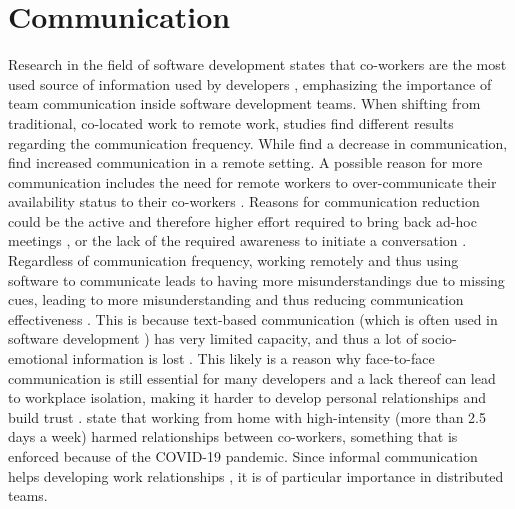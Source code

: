 \section{Communication}
Research in the field of software development states that co-workers are the most used source of information used by developers \autocite{ko2007information}, emphasizing the importance of team communication inside software development teams. When shifting from traditional, co-located work to remote work, studies find different results regarding the communication frequency. While \textcite{kraut1988patterns, allen1984managing} find a decrease in communication, \textcite{mulki2009set} find increased communication in a remote setting. A possible reason for more communication includes the need for remote workers to over-communicate their availability status to their co-workers \autocite{koehne2012remote}. Reasons for communication reduction could be the active and therefore higher effort required to bring back ad-hoc meetings \autocite{miller2021your}, or the lack of the required awareness to initiate a conversation \autocite{chang2007out, gutwin1995support}. Regardless of communication frequency, working remotely and thus using software to communicate leads to having more misunderstandings due to missing cues, leading to more misunderstanding and thus reducing communication effectiveness \autocite{mulki2009set}. This is because text-based communication (which is often used in software development \autocite{gutwin2004group}) has very limited capacity, and thus a lot of socio-emotional information is lost \autocite{hassib2017heartchat}. This likely is a reason why face-to-face communication is still essential for many developers \autocite{storey2016social} and a lack thereof can lead to workplace isolation, making it harder to develop personal relationships and build trust \autocite{mulki2009set}. \textcite{gajendran2007good} state that working from home with high-intensity (more than 2.5 days a week) harmed relationships between co-workers, something that is enforced because of the COVID-19 pandemic. Since informal communication helps developing work relationships \autocite{comella2020revisiting, olson2006bridging}, it is of particular importance in distributed teams.

